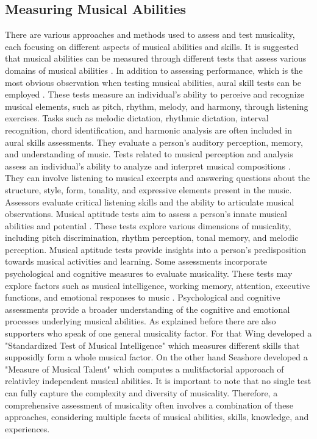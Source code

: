\subsection{Measuring Musical Abilities}
\label{cap:musicalabilities}
There are various approaches and methods used to assess and test musicality, each focusing on different aspects of musical abilities and skills. It is suggested that musical abilities can be measured through different tests that assess various domains of musical abilities \cite{Werner2016}. In addition to assessing performance, which is the most obvious observation when testing musical abilities, aural skill tests can be employed \cite{Harrison2018, MacGregor2019, Harrison2017}. These tests measure an individual's ability to perceive and recognize musical elements, such as pitch, rhythm, melody, and harmony, through listening exercises. Tasks such as melodic dictation, rhythmic dictation, interval recognition, chord identification, and harmonic analysis are often included in aural skills assessments. They evaluate a person's auditory perception, memory, and understanding of music. 
Tests related to musical perception and analysis assess an individual's ability to analyze and interpret musical compositions \cite{Lee2020}. They can involve listening to musical excerpts and answering questions about the structure, style, form, tonality, and expressive elements present in the music. Assessors evaluate critical listening skills and the ability to articulate musical observations. 
Musical aptitude tests aim to assess a person's innate musical abilities and potential \cite{Gordon1968}. These tests explore various dimensions of musicality, including pitch discrimination, rhythm perception, tonal memory, and melodic perception. Musical aptitude tests provide insights into a person's predisposition towards musical activities and learning. 
Some assessments incorporate psychological and cognitive measures to evaluate musicality. These tests may explore factors such as musical intelligence, working memory, attention, executive functions, and emotional responses to music \cite{Mullensiefen2013}. Psychological and cognitive assessments provide a broader understanding of the cognitive and emotional processes underlying musical abilities.
As explained before there are also supporters who speak of one general musicality factor. For that Wing \cite{Wing1961} developed a "Standardized Test of Musical Intelligence" which measures different skills that supposidly form a whole musical factor. On the other hand Seashore \cite{Seashore1919} developed a "Measure of Musical Talent" which computes a mulitfactorial apporoach of relativley independent musical abilities. 
It is important to note that no single test can fully capture the complexity and diversity of musicality. Therefore, a comprehensive assessment of musicality often involves a combination of these approaches, considering multiple facets of musical abilities, skills, knowledge, and experiences.

